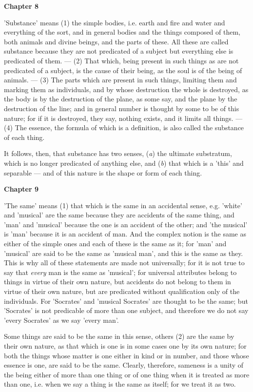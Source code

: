 \textbf{Chapter 8}

'Substance' means (1) the simple bodies, i.e. earth and fire and water and everything of the sort, and in general bodies and the things composed of them, both animals and divine beings, and the parts of these. All these are called substance because they are not predicated of a subject but everything else is predicated of them. — (2) That which, being present in such things as are not predicated of a subject, is the cause of their being, as the soul is of the being of animals. — (3) The parts which are present in such things, limiting them and marking them as individuals, and by whose destruction the whole is destroyed, as the body is by the destruction of the plane, as some say, and the plane by the destruction of the line; and in general number is thought by some to be of this nature; for if it is destroyed, they say, nothing exists, and it limits all things. — (4) The essence, the formula of which is a definition, is also called the substance of each thing.

It follows, then, that substance has two senses, (\emph{a}) the ultimate substratum, which is no longer predicated of anything else, and (\emph{b}) that which is a 'this' and separable — and of this nature is the shape or form of each thing.

\textbf{Chapter 9}

'The same' means (1) that which is the same in an accidental sense, e.g. 'white' and 'musical' are the same because they are accidents of the same thing, and 'man' and 'musical' because the one is an accident of the other; and 'the musical' is 'man' because it is an accident of man. And the complex notion is the same as either of the simple ones and each of these is the same as it; for 'man' and 'musical' are said to be the same as 'musical man', and this is the same as they. This is why all of these statements are made not universally; for it is not true to say that \emph{every} man is the same as 'musical'; for universal attributes belong to things in virtue of their own nature, but accidents do not belong to them in virtue of their own nature, but are predicated without qualification only of the individuals. For 'Socrates' and 'musical Socrates' are thought to be the same; but 'Socrates' is not predicable of more than one subject, and therefore we do not say 'every Socrates' as we say 'every man'.

Some things are said to be the same in this sense, others (2) are the same by their own nature, as that which is one is in some cases one by its own nature; for both the things whose matter is one either in kind or in number, and those whose essence is one, are said to be the same. Clearly, therefore, sameness is a unity of the being either of more than one thing or of one thing when it is treated as more than one, i.e. when we say a thing is the same as itself; for we treat it as two.

